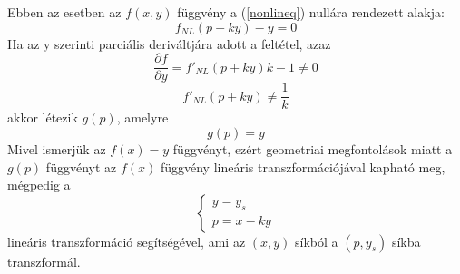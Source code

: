 Ebben az esetben az $f(x,y)$ függvény a (\ref{nonlineq}) nullára rendezett alakja:
\begin{equation}
    f_{NL}(p+ky)-y=0
\end{equation}
Ha az y szerinti parciális deriváltjára adott a feltétel, azaz
\begin{equation}
    \frac{\partial{f}}{\partial{y}}=f'_{NL}(p+ky)k-1 \neq 0
\end{equation}
\begin{equation}
    f'_{NL}(p+ky) \neq \frac{1}{k}
\end{equation}
akkor létezik $g(p)$, amelyre
\begin{equation}
    g(p)=y
\end{equation}
Mivel ismerjük az $f(x)=y$ függvényt, ezért geometriai megfontolások 
miatt \cite{borin} a $g(p)$ függvényt az $f(x)$ függvény lineáris transzformációjával 
kapható meg, mégpedig a
\begin{equation}
    \begin{cases}
        y=y_s \\
        p=x-ky
    \end{cases}
\end{equation}
lineáris transzformáció segítségével, ami az $(x,y)$ síkból a $(p,y_s)$ síkba transzformál.

